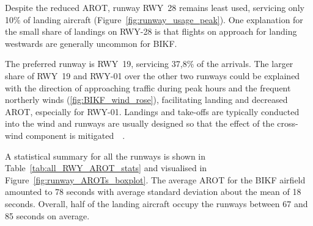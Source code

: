 Despite the reduced AROT, runway RWY~28 remains least used, servicing only 10$\%$ of landing aircraft (Figure~\ref{fig:runway_usage_peak}). One explanation for the small share of landings on RWY-28 is that flights on approach for landing westwards are generally uncommon for BIKF. 

The preferred runway is RWY~19, servicing 37,8$\%$ of the arrivals. The larger share of RWY~19 and RWY-01 over the other two runways could be explained with the direction of approaching traffic during peak hours and the frequent northerly winds (\ref{fig:BIKF_wind_rose}), facilitating landing and decreased AROT, especially for RWY-01. Landings and take-offs are typically conducted into the wind and runways are usually designed so that the effect of the cross-wind component is mitigated~\cite[p.~301]{de_neufville_airport_2013}~\cite{manual1991_doc9157}.

\begin{table}[h]
\centering
{}
\caption[AROTs during peak hours by runway]{AROT statistics for the air traffic mix at BIKF by runway. The count is the number of landings during peak hours from October 2017 to November 2018.}
\label{tab:all_RWY_AROT_stats}
\end{table}

A statistical summary for all the runways is shown in Table~\ref{tab:all_RWY_AROT_stats} and visualised in Figure~\ref{fig:runway_AROTs_boxplot}. The average AROT for the BIKF airfield amounted to 78 seconds with average standard deviation about the mean of 18 seconds. Overall, half of the landing aircraft occupy the runways between 67 and 85 seconds on average. 

